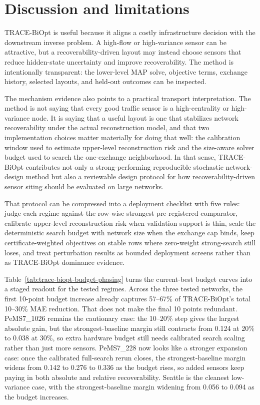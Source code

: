 \section{Discussion and limitations}
\label{sec:discussion}

TRACE-BiOpt is useful because it aligns a costly infrastructure decision with the downstream inverse problem. A high-flow or high-variance sensor can be attractive, but a recoverability-driven layout may instead choose sensors that reduce hidden-state uncertainty and improve recoverability. The method is intentionally transparent: the lower-level MAP solve, objective terms, exchange history, selected layouts, and held-out outcomes can be inspected.

The mechanism evidence also points to a practical transport interpretation.
The method is not saying that every good traffic sensor is a high-centrality or
high-variance node. It is saying that a useful layout is one that stabilizes
network recoverability under the actual reconstruction model, and that two
implementation choices matter materially for doing that well: the calibration
window used to estimate upper-level reconstruction risk and the size-aware
solver budget used to search the one-exchange neighborhood. In that sense,
TRACE-BiOpt contributes not only a strong-performing reproducible stochastic
network-design method but also a
reviewable design protocol for how recoverability-driven sensor siting should be
evaluated on large networks.

That protocol can be compressed into a deployment checklist with five rules: judge each regime against the row-wise strongest pre-registered comparator, calibrate upper-level reconstruction risk when validation support is thin, scale the deterministic search budget with network size when the exchange cap binds, keep certificate-weighted objectives on stable rows where zero-weight strong-search still loses, and treat perturbation results as bounded deployment screens rather than as TRACE-BiOpt dominance evidence.


Table~\ref{tab:trace-biopt-budget-phasing} turns the current-best budget curves
into a staged readout for the tested regimes. Across the three tested networks, the first
10-point budget increase already captures 57--67\% of TRACE-BiOpt's total
10--30\% MAE reduction. That does not make the final 10 points redundant.
PeMS7\_1026 remains the cautionary case: the 10--20\% step gives the largest
absolute gain, but the strongest-baseline margin still contracts from 0.124 at
20\% to 0.038 at 30\%, so extra hardware budget still needs calibrated search
scaling rather than just more sensors. PeMS7\_228 now looks like a stronger
expansion case: once the calibrated full-search rerun closes, the
strongest-baseline margin widens from 0.142 to 0.276 to 0.336 as the budget
rises, so added sensors keep paying in both absolute and relative
recoverability. Seattle is the cleanest low-variance case, with
the strongest-baseline margin widening from 0.056 to 0.094 as the budget
increases.

